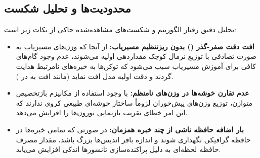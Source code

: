 \subsection{محدودیت‌ها و تحلیل شکست}
تحلیل دقیق رفتار الگوریتم و شکست‌های مشاهده‌شده حاکی از نکات زیر است:
\begin{itemize}
    \item \textbf{افت دقت صفر-گذر () بدون ریزتنظیم مسیریاب:} از آنجا که وزن‌های مسیریاب به صورت تصادفی با توزیع نرمال کوچک مقداردهی اولیه می‌شوند، عدم وجود گام‌های کافی برای آموزش مسیریاب سبب می‌شود که توکن‌ها به خبره‌های نامرتبط هدایت گردند و دقت اولیه مدل افت نماید (مانند افت به  در ).
    \item \textbf{عدم تقارن خوشه‌ها در وزن‌های نامنظم:} با وجود استفاده از مکانیزم بازتخصیص متوازن، توزیع وزن‌های پیش‌خوران لزوماً ساختار خوشه‌ای طبیعی کروی ندارند که این امر خطای تقریب بازنمایی نورون‌ها را افزایش می‌دهد.
    \item \textbf{بار اضافه حافظه ناشی از چند خبره همزمان:} در صورتی که تمامی خبره‌ها در حافظه گرافیکی نگهداری شوند و اندازه بافر اندیس‌ها بزرگ باشد، مقدار مصرف حافظه لحظه‌ای به دلیل پراکنده‌سازی تانسورها اندکی افزایش می‌یابد.
\end{itemize}
